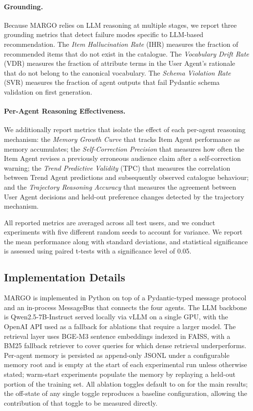 \documentclass[master,english,final]{postech-ucs}
\begin{document}
\paragraph{Grounding.}
Because MARGO relies on LLM reasoning at multiple stages, we report three grounding metrics that detect failure modes specific to LLM-based recommendation.
The \emph{Item Hallucination Rate} (IHR) measures the fraction of recommended items that do not exist in the catalogue.
The \emph{Vocabulary Drift Rate} (VDR) measures the fraction of attribute terms in the User Agent's rationale that do not belong to the canonical vocabulary.
The \emph{Schema Violation Rate} (SVR) measures the fraction of agent outputs that fail Pydantic schema validation on first generation.

\paragraph{Per-Agent Reasoning Effectiveness.}
We additionally report metrics that isolate the effect of each per-agent reasoning mechanism: the \emph{Memory Growth Curve} that tracks Item Agent performance as memory accumulates; the \emph{Self-Correction Precision} that measures how often the Item Agent revises a previously erroneous audience claim after a self-correction warning; the \emph{Trend Predictive Validity} (TPC) that measures the correlation between Trend Agent predictions and subsequently observed catalogue behaviour; and the \emph{Trajectory Reasoning Accuracy} that measures the agreement between User Agent decisions and held-out preference changes detected by the trajectory mechanism.

All reported metrics are averaged across all test users, and we conduct experiments with five different random seeds to account for variance.
We report the mean performance along with standard deviations, and statistical significance is assessed using paired t-tests with a significance level of 0.05.


\subsection{Implementation Details}

MARGO is implemented in Python on top of a Pydantic-typed message protocol and an in-process MessageBus that connects the four agents.
The LLM backbone is Qwen2.5-7B-Instruct served locally via vLLM on a single GPU, with the OpenAI API used as a fallback for ablations that require a larger model.
The retrieval layer uses BGE-M3 sentence embeddings indexed in FAISS, with a BM25 fallback retriever to cover queries for which dense retrieval underperforms.
Per-agent memory is persisted as append-only JSONL under a configurable memory root and is empty at the start of each experimental run unless otherwise stated; warm-start experiments populate the memory by replaying a held-out portion of the training set.
All ablation toggles default to on for the main results; the off-state of any single toggle reproduces a baseline configuration, allowing the contribution of that toggle to be measured directly.
\end{document}
